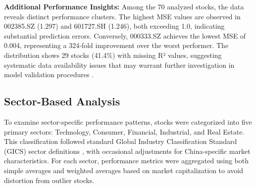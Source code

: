 \documentclass[3p,times,procedia]{elsarticle}
\begin{document}
\textbf{Additional Performance Insights:} Among the 70 analyzed stocks, the data reveals distinct performance clusters. The highest MSE values are observed in 002385.SZ (1.297) and 601727.SH (1.246), both exceeding 1.0, indicating substantial prediction errors. Conversely, 000333.SZ achieves the lowest MSE of 0.004, representing a 324-fold improvement over the worst performer. The distribution shows 29 stocks (41.4\%) with missing R² values, suggesting systematic data availability issues that may warrant further investigation in model validation procedures \cite{Shah2019}.





\subsection{Sector-Based Analysis}
To examine sector-specific performance patterns, stocks were categorized into five primary sectors: Technology, Consumer, Financial, Industrial, and Real Estate. This classification followed standard Global Industry Classification Standard (GICS) sector definitions \cite{MSCI2018}, with occasional adjustments for China-specific market characteristics. For each sector, performance metrics were aggregated using both simple averages and weighted averages based on market capitalization to avoid distortion from outlier stocks.

\begin{table}[!ht]
\centering
\caption{\textbf{Sector-wise Average Performance Metrics}}
\end{table}
\end{document}
